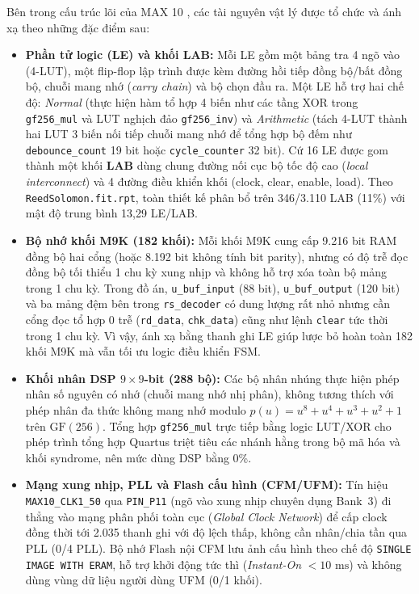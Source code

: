 \documentclass[11pt,a4paper]{report}
\begin{document}
Bên trong cấu trúc lõi của MAX 10 \cite{intelmax10}, các tài nguyên vật lý được tổ chức và ánh xạ theo những đặc điểm sau:
\begin{itemize}
    \item \textbf{Phần tử logic (LE) và khối LAB:} Mỗi LE gồm một bảng tra 4 ngõ vào (4-LUT), một flip-flop lập trình được kèm đường hồi tiếp đồng bộ/bất đồng bộ, chuỗi mang nhớ (\textit{carry chain}) và bộ chọn đầu ra. Một LE hỗ trợ hai chế độ: \textit{Normal} (thực hiện hàm tổ hợp 4 biến như các tầng XOR trong \texttt{gf256\_mul} và LUT nghịch đảo \texttt{gf256\_inv}) và \textit{Arithmetic} (tách 4-LUT thành hai LUT 3 biến nối tiếp chuỗi mang nhớ để tổng hợp bộ đếm như \texttt{debounce\_count} 19 bit hoặc \texttt{cycle\_counter} 32 bit). Cứ 16 LE được gom thành một khối \textbf{LAB} dùng chung đường nối cục bộ tốc độ cao (\textit{local interconnect}) và 4 đường điều khiển khối (clock, clear, enable, load). Theo \texttt{ReedSolomon.fit.rpt}, toàn thiết kế phân bổ trên 346/3.110 LAB (11\%) với mật độ trung bình 13,29 LE/LAB.
    \item \textbf{Bộ nhớ khối M9K (182 khối):} Mỗi khối M9K cung cấp 9.216 bit RAM đồng bộ hai cổng (hoặc 8.192 bit không tính bit parity), nhưng có độ trễ đọc đồng bộ tối thiểu 1 chu kỳ xung nhịp và không hỗ trợ xóa toàn bộ mảng trong 1 chu kỳ. Trong đồ án, \texttt{u\_buf\_input} (88 bit), \texttt{u\_buf\_output} (120 bit) và ba mảng đệm bên trong \texttt{rs\_decoder} có dung lượng rất nhỏ nhưng cần cổng đọc tổ hợp 0 trễ (\texttt{rd\_data}, \texttt{chk\_data}) cũng như lệnh \texttt{clear} tức thời trong 1 chu kỳ. Vì vậy, ánh xạ bằng thanh ghi LE giúp lược bỏ hoàn toàn 182 khối M9K mà vẫn tối ưu logic điều khiển FSM.
    \item \textbf{Khối nhân DSP $9\times 9$-bit (288 bộ):} Các bộ nhân nhúng thực hiện phép nhân số nguyên có nhớ (chuỗi mang nhớ nhị phân), không tương thích với phép nhân đa thức không mang nhớ modulo $p(u) = u^8 + u^4 + u^3 + u^2 + 1$ trên $\text{GF}(256)$. Tổng hợp \texttt{gf256\_mul} trực tiếp bằng logic LUT/XOR cho phép trình tổng hợp Quartus triệt tiêu các nhánh hằng trong bộ mã hóa và khối syndrome, nên mức dùng DSP bằng 0\%.
    \item \textbf{Mạng xung nhịp, PLL và Flash cấu hình (CFM/UFM):} Tín hiệu \texttt{MAX10\_CLK1\_50} qua \texttt{PIN\_P11} (ngõ vào xung nhịp chuyên dụng Bank~3) đi thẳng vào mạng phân phối toàn cục (\textit{Global Clock Network}) để cấp clock đồng thời tới 2.035 thanh ghi với độ lệch thấp, không cần nhân/chia tần qua PLL (0/4 PLL). Bộ nhớ Flash nội CFM lưu ảnh cấu hình theo chế độ \texttt{SINGLE IMAGE WITH ERAM}, hỗ trợ khởi động tức thì (\textit{Instant-On} $<10\text{ ms}$) và không dùng vùng dữ liệu người dùng UFM (0/1 khối).
\end{itemize}
\end{document}
